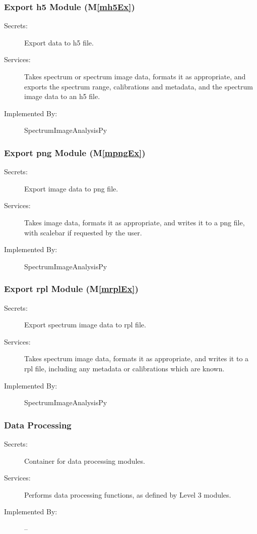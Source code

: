 \documentclass[12pt, titlepage]{article}
\newcommand{\mref}[1]{M\ref{#1}}
\newcommand{\progname}{SpectrumImageAnalysisPy}
\begin{document}
\subsubsection{Export h5 Module (\mref{mh5Ex})}
\begin{description}
	\item[Secrets:]Export data to h5 file.
	\item[Services:]Takes spectrum or spectrum image data, formats it as appropriate, and exports the spectrum range, calibrations and metadata, and the spectrum image data to an h5 file.
	\item[Implemented By:] \progname
\end{description}

\subsubsection{Export png Module (\mref{mpngEx})}
\begin{description}
	\item[Secrets:]Export image data to png file.
	\item[Services:]Takes image data, formats it as appropriate, and writes it to a png file, with scalebar if requested by the user.
	\item[Implemented By:] \progname
\end{description}

\subsubsection{Export rpl Module (\mref{mrplEx})}
\begin{description}
	\item[Secrets:]Export spectrum image data to rpl file.
	\item[Services:]Takes spectrum image data, formats it as appropriate, and writes it to a rpl file, including any metadata or calibrations which are known.
	\item[Implemented By:] \progname
\end{description}

\subsubsection{Data Processing}
\begin{description}
	\item[Secrets:]Container for data processing modules.
	\item[Services:]Performs data processing functions, as defined by Level 3 modules.
	\item[Implemented By:] --
\end{description}
\end{document}
